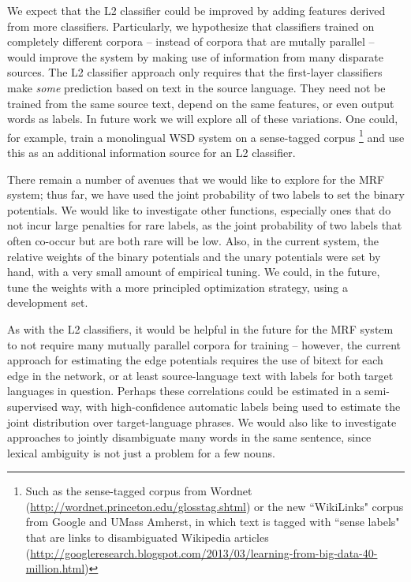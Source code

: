 \documentclass[11pt,letterpaper]{article}
\begin{document}

We expect that the L2 classifier could be improved by adding features
derived
from more classifiers. Particularly, we hypothesize that classifiers trained on
completely different corpora -- instead of corpora that are mutally parallel --
would improve the system by making use of information from many disparate
sources. The L2 classifier approach only requires that the first-layer
classifiers make \emph{some} prediction based on text in the source language.
They need not be trained from the same source text, depend on the same
features, or even output words as labels. In future work we will explore
all of these variations. One could, for example, train a monolingual WSD system
on a sense-tagged corpus \footnote{Such as the sense-tagged corpus from Wordnet
(\url{http://wordnet.princeton.edu/glosstag.shtml})
or the new ``WikiLinks" corpus from Google and UMass Amherst, in which text is
tagged with ``sense labels" that are links to disambiguated Wikipedia
articles
(\url{http://googleresearch.blogspot.com/2013/03/learning-from-big-data-40-million.html})}
and use this as an additional information source for an L2 classifier.

There remain a number of avenues that we would like to explore for the MRF
system; thus far, we have used the joint probability of two labels to set the
binary potentials. We would like to investigate other functions, especially
ones that do not incur large penalties for rare labels, as the joint
probability of two labels that often co-occur but are both rare will be low.
Also, in the current system, the relative weights of the binary potentials and
the unary potentials were set by hand, with a very small amount of empirical
tuning. We could, in the future, tune the weights with a more principled
optimization strategy, using a development set.


As with the L2 classifiers, it would be helpful in the future for the
MRF system to not require many mutually parallel corpora for training --
however, the current approach for estimating the edge potentials requires the
use of bitext for each edge in the network, or at least source-language text
with labels for both target languages in question. Perhaps these correlations
could be estimated in a semi-supervised way, with high-confidence automatic
labels being used to estimate the joint distribution over target-language
phrases.  We would also like to investigate approaches to jointly disambiguate
many words in the same sentence, since lexical ambiguity is not just a problem
for a few nouns.
\end{document}
